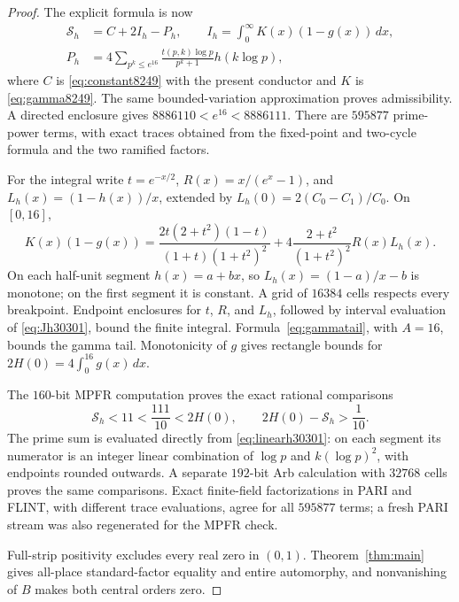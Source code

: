 \documentclass[11pt]{article}
\theoremstyle{definition}
\theoremstyle{remark}
\newcommand{\dd}{\,d}
\numberwithin{equation}{section}
\begin{document}
\begin{proof}
The explicit formula is now
\begin{equation}\label{eq:EF30301}
\begin{split}
\mathcal S_h&=C+2I_h-P_h,\qquad I_h=\int_0^\infty K(x)(1-g(x))\dd x,\\
P_h&=4\sum_{p^k\le e^{16}}\frac{t(p,k)\log p}{p^k+1}h(k\log p),
\end{split}
\end{equation}
where $C$ is \eqref{eq:constant8249} with the present conductor and $K$ is \eqref{eq:gamma8249}. The same bounded-variation approximation proves admissibility. A directed enclosure gives $8886110<e^{16}<8886111$. There are $595877$ prime-power terms, with exact traces obtained from the fixed-point and two-cycle formula and the two ramified factors.

For the integral write $t=e^{-x/2}$, $R(x)=x/(e^x-1)$, and $L_h(x)=(1-h(x))/x$, extended by $L_h(0)=2(C_0-C_1)/C_0$. On $[0,16]$,
\begin{equation}\label{eq:Jh30301}
K(x)(1-g(x))=
\frac{2t(2+t^2)(1-t)}{(1+t)(1+t^2)^2}
+4\frac{2+t^2}{(1+t^2)^2}R(x)L_h(x).
\end{equation}
On each half-unit segment $h(x)=a+bx$, so $L_h(x)=(1-a)/x-b$ is monotone; on the first segment it is constant. A grid of $16384$ cells respects every breakpoint. Endpoint enclosures for $t$, $R$, and $L_h$, followed by interval evaluation of \eqref{eq:Jh30301}, bound the finite integral. Formula~\eqref{eq:gammatail}, with $A=16$, bounds the gamma tail. Monotonicity of $g$ gives rectangle bounds for $2H(0)=4\int_0^{16}g(x)\dd x$.

The $160$-bit MPFR computation proves the exact rational comparisons
\begin{equation}\label{eq:bounds30301}
\mathcal S_h<11<\frac{111}{10}<2H(0),\qquad
2H(0)-\mathcal S_h>\frac1{10}.
\end{equation}
The prime sum is evaluated directly from \eqref{eq:linearh30301}: on each segment its numerator is an integer linear combination of $\log p$ and $k(\log p)^2$, with endpoints rounded outwards. A separate $192$-bit Arb calculation with $32768$ cells proves the same comparisons. Exact finite-field factorizations in PARI and FLINT, with different trace evaluations, agree for all $595877$ terms; a fresh PARI stream was also regenerated for the MPFR check.

Full-strip positivity excludes every real zero in $(0,1)$. Theorem~\ref{thm:main} gives all-place standard-factor equality and entire automorphy, and nonvanishing of $B$ makes both central orders zero.
\end{proof}
\end{document}

